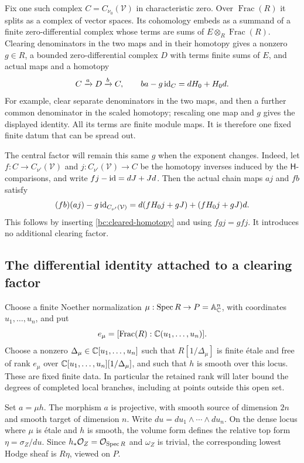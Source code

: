 Fix one such complex $C=C_{\nu_0}(\mathcal V)$ in characteristic zero.
Over $\operatorname{Frac}(R)$ it splits as a complex of vector spaces.
Its cohomology embeds as a summand of a finite zero-differential complex
whose terms are sums of $E\otimes_R\operatorname{Frac}(R)$.  Clearing
denominators in the two maps and in their homotopy gives a nonzero
$g\in R$, a bounded zero-differential complex $D$ with terms finite
sums of $E$, and actual maps and a homotopy
\begin{equation}\label{bc:cleared-homotopy}
 C\xrightarrow{a}D\xrightarrow{b}C,
 \qquad ba-g\operatorname{id}_C=dH_0+H_0d.
\end{equation}
For example, clear separate denominators in the two maps, and then a
further common denominator in the scaled homotopy; rescaling one map
and $g$ gives the displayed identity.  All its terms are finite
module maps.  It is therefore one fixed finite datum that can be
spread out.

The central factor will remain this same $g$ when the exponent changes.
Indeed, let $f:C\to C_{\nu'}(\mathcal V)$ and
$j:C_{\nu'}(\mathcal V)\to C$ be the homotopy inverses induced by the
$\mathsf H$-comparisons, and write
$fj-\operatorname{id}=dJ+Jd$.  Then the actual chain maps $aj$ and $fb$ satisfy
\begin{equation}\label{bc:transported-homotopy}
 (fb)(aj)-g\operatorname{id}_{C_{\nu'}(\mathcal V)}
       =d(fH_0j+gJ)+(fH_0j+gJ)d.
\end{equation}
This follows by inserting \eqref{bc:cleared-homotopy} and using
$fgj=gfj$.  It introduces no additional clearing factor.

\subsection{The differential identity attached to a clearing factor}

Choose a finite Noether normalization
$\mu:\operatorname{Spec} R\to P=\mathbb A^n_\mathbb C$, with coordinates $u_1,\ldots,u_n$,
and put
\[
 e_\mu=[\operatorname{Frac}(R):\mathbb C(u_1,\ldots,u_n)].
\]
Choose a nonzero $\Delta_\mu\in\mathbb C[u_1,\ldots,u_n]$ such that
$R[1/\Delta_\mu]$ is finite \'{e}tale and free of rank $e_\mu$ over
$\mathbb C[u_1,\ldots,u_n][1/\Delta_\mu]$, and such that $h$ is smooth over
this locus.  These are fixed finite data.  In particular the retained
rank will later bound the degrees of completed local branches, including
at points outside this open set.

Set $a=\mu h$.
The morphism $a$ is projective, with smooth source of dimension $2n$
and smooth target of dimension $n$.  Write
$du=du_1\wedge\cdots\wedge du_n$.  On the dense locus where $\mu$ is
\'{e}tale and $h$ is smooth, the volume form defines the relative top form
$\eta=\sigma_Z/du$.  Since $h_*\mathcal O_Z=\mathcal O_{\operatorname{Spec} R}$ and
$\omega_Z$ is trivial, the corresponding lowest Hodge sheaf is
$R\eta$, viewed on $P$.

